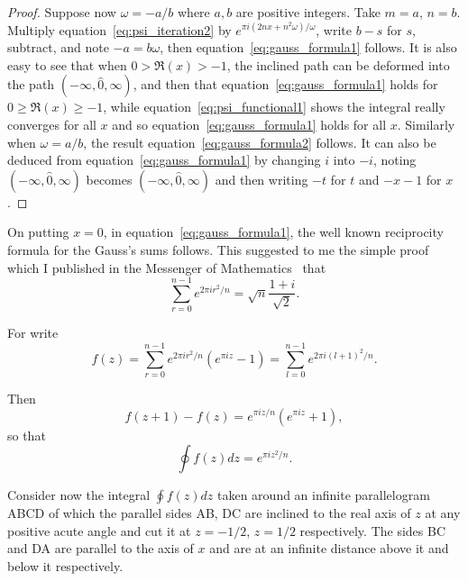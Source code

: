 \documentclass[12pt]{article}
\theoremstyle{remark}
\begin{document}
\begin{proof}
Suppose now $\omega = -a/b$ where $a, b$ are positive integers. Take $m = a$, $n = b$. Multiply equation~\eqref{eq:psi_iteration2} by $e^{\pi i(2nx+n^2\omega)/\omega}$, write $b-s$ for $s$, subtract, and note $-a = b\omega$, then equation~\eqref{eq:gauss_formula1} follows. It is also easy to see that when $0 > \Re(x) > -1$, the inclined path can be deformed into the path $(-\infty, \hat{0}, \infty)$, and then that equation~\eqref{eq:gauss_formula1} holds for $0 \geq \Re(x) \geq -1$, while equation~\eqref{eq:psi_functional1} shows the integral really converges for all $x$ and so equation~\eqref{eq:gauss_formula1} holds for all $x$. Similarly when $\omega = a/b$, the result equation~\eqref{eq:gauss_formula2} follows. It can also be deduced from equation~\eqref{eq:gauss_formula1} by changing $i$ into $-i$, noting $(-\infty, \hat{0}, \infty)$ becomes $(-\infty, \hat{0}, \infty)$ and then writing $-t$ for $t$ and $-x-1$ for $x$.
\end{proof}

On putting $x = 0$, in equation~\eqref{eq:gauss_formula1}, the well known reciprocity formula for the Gauss's sums follows. This suggested to me the simple proof which I published in the Messenger of Mathematics~\cite{Mordell1918} that
\begin{equation}\label{eq:gauss_sum_reciprocity}
\sum_{r=0}^{n-1} e^{2\pi ir^2/n} = \sqrt{n} \frac{1+i}{\sqrt{2}}.
\end{equation}

For write
\begin{equation}\label{eq:gauss_sum_function}
f(z) = \sum_{r=0}^{n-1} e^{2\pi ir^2/n}(e^{\pi iz} - 1) = \sum_{l=0}^{n-1} e^{2\pi i(l+1)^2/n}.
\end{equation}

Then
\begin{equation}\label{eq:gauss_sum_difference}
f(z + 1) - f(z) = e^{\pi iz/n}(e^{\pi iz} + 1),
\end{equation}
so that
\begin{equation}\label{eq:gauss_sum_integral}
\oint f(z) dz = e^{\pi iz^2/n}.
\end{equation}

Consider now the integral $\oint f(z) dz$ taken around an infinite parallelogram ABCD of which the parallel sides AB, DC are inclined to the real axis of $z$ at any positive acute angle and cut it at $z = -1/2$, $z = 1/2$ respectively. The sides BC and DA are parallel to the axis of $x$ and are at an infinite distance above it and below it respectively.
\end{document}
